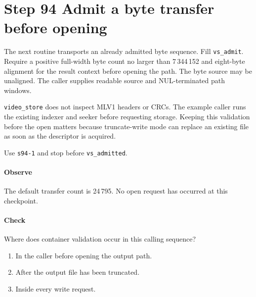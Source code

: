 \section{Step 94 Admit a byte transfer before opening}
The next routine transports an already admitted byte sequence. Fill \texttt{vs\_admit}. Require a positive full-width byte count no larger than 7\,344\,152 and eight-byte alignment for the result context before opening the path. The byte source may be unaligned. The caller supplies readable source and NUL-terminated path windows.

\texttt{video\_store} does not inspect MLV1 headers or CRCs. The example caller runs the existing indexer and seeker before requesting storage. Keeping this validation before the open matters because truncate-write mode can replace an existing file as soon as the descriptor is acquired.

Use \texttt{s94-1} and stop before \texttt{vs\_admitted}.

\paragraph{Observe} The default transfer count is 24\,795. No open request has occurred at this checkpoint.

\paragraph{Check} Where does container validation occur in this calling sequence?
\begin{enumerate}[label=\Alph*.]
  \item In the caller before opening the output path.
  \item After the output file has been truncated.
  \item Inside every write request.
\end{enumerate}

